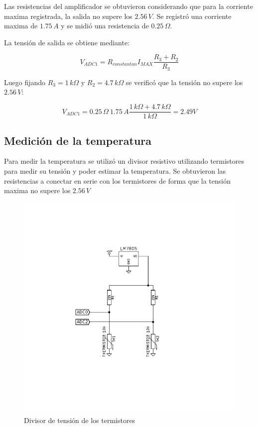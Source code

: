 \documentclass[10pt,spanish,a4paper,openany,notitlepage]{article}
\begin{document}
Las resistencias del amplificador se obtuvieron considerando que para
la corriente maxima registrada, la salida no supere los $2.56\, \unit{V}$.
Se registró una corriente maxima de $1.75\, \unit{A}$ y se midió una
resistencia de $0.25\, \unit{\Omega}$.

La tensión de salida se obtiene mediante:

\begin{equation}
V_{ADC1} = R_{constantan} I_{MAX} \frac{R_3 + R_2}{R_3}
\label{eq:tension_salida}
\end{equation}

Luego fijando $R_3 = 1\, \unit{k\Omega}$ y $R_2 = 4.7\, \unit{k\Omega}$
se verificó que la tensión no supere los $2.56\, \unit{V}$:

\[ \displaystyle V_{ADC1} = 0.25\, \unit{\Omega}\ 1.75\, \unit{A} \frac{1\, \unit{k\Omega} + 4.7\, \unit{k\Omega}}{1\, \unit{k\Omega}} = 2.49 \unit{V} \]

\subsection{Medición de la temperatura}

Para medir la temperatura se utilizó un divisor resistivo
utilizando termistores para medir su tensión y poder estimar la temperatura.
Se obtuvieron las resistencias a conectar en serie con los termistores de
forma que la tensión maxima no supere los $2.56\, \unit{V}$

\begin{figure}[H] %
\begin{center}
\includegraphics[scale=1]{../circuitos/temperatura.pdf}
\caption{Divisor de tensión de los termistores}
 \label{fig:temperatura}
\end{center}
\end{figure}
\end{document}
